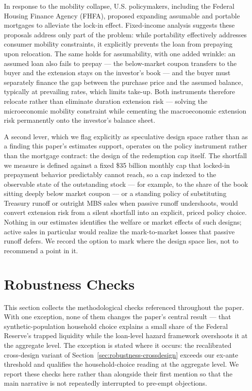 \documentclass[12pt]{article}
\begin{document}
In response to the mobility collapse, U.S. policymakers, including the Federal Housing Finance Agency (FHFA), proposed expanding assumable and portable mortgages to alleviate the lock-in effect. Fixed-income analysis suggests these proposals address only part of the problem: while portability effectively addresses consumer mobility constraints, it explicitly prevents the loan from prepaying upon relocation. The same holds for assumability, with one added wrinkle: an assumed loan also fails to prepay --- the below-market coupon transfers to the buyer and the extension stays on the investor's book --- and the buyer must separately finance the gap between the purchase price and the assumed balance, typically at prevailing rates, which limits take-up. Both instruments therefore relocate rather than eliminate duration extension risk --- solving the microeconomic mobility constraint while cementing the macroeconomic extension risk permanently onto the investor's balance sheet.

A second lever, which we flag explicitly as speculative design space rather than as a finding this paper's estimates support, operates on the policy instrument rather than the mortgage contract: the design of the redemption cap itself. The shortfall we measure is defined against a fixed \$35 billion monthly cap that locked-in prepayment behavior predictably cannot reach, so a cap indexed to the observable state of the outstanding stock --- for example, to the share of the book sitting deeply below market coupon --- or a standing policy of substituting Treasury runoff or outright MBS sales when passive runoff undershoots, would convert extension risk from a silent shortfall into an explicit, priced policy choice. Nothing in our estimates identifies the welfare or market effects of such designs; active sales in particular would realize the mark-to-market losses that passive runoff defers. We record the option to mark where the design space lies, not to recommend a point in it.

\section{Robustness Checks}\label{sec:robustness}

This section collects the methodological checks referenced throughout the paper. With one exception, none of them changes the paper's central result --- that synthetic-population household choice explains a small share of the Federal Reserve's trapped liquidity while the loan-level hazard framework overshoots it at the aggregate level. The exception is stated where it occurs: the recalibrated cross-design variant of Section~\ref{sec:robustness-crossdesign} exceeds our ex-ante threshold and qualifies the household-choice reading at the aggregate level. We report these checks here rather than alongside their first mention so that the main narrative is not repeatedly interrupted to pre-empt objections.
\end{document}
